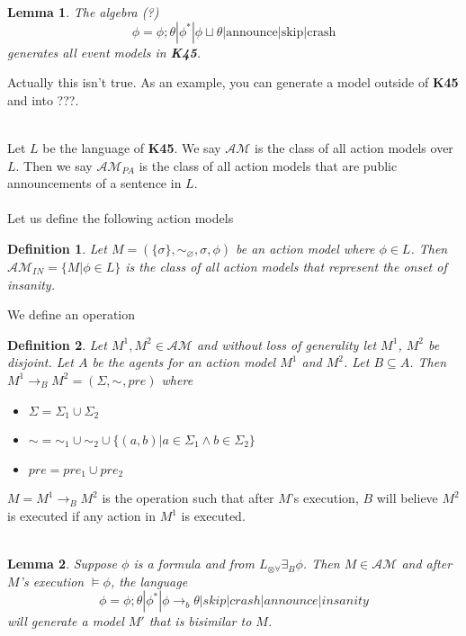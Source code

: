 \documentclass[12pt, a4paper, titlepage]{scrartcl}
\newcommand{\aRel}[1] {
  \sim_{#1} 
}
\newcommand{\actModel}[3]{
  (#1, \aRel{#2}, #3)
}
\newtheorem{defn}{Definition}
\newtheorem{lemma}{Lemma}
\begin{document}
\begin{lemma}
	The algebra (?)
	\[
		\phi = \phi ; \theta | \phi ^{\ast} | \phi \sqcup \theta | \text{announce} |
		\text{skip} | \text{crash}
	\]
	generates all event models in {\bf K45}.
\end{lemma}

\begin{note}
	Actually this isn't true.
	As an example, you can generate a model outside of {\bf K45} and into ???.\\
\end{note}
\\
Let $L$ be the language of {\bf K45}.
We say $\mathcal{AM}$ is the class of all action models over $L$.
Then we say $\mathcal{AM}_{PA}$ is the class of all action models that
are public announcements of a sentence in $L$.\\
\\
Let us define the following action models
\begin{defn} \label{insanity}
Let $M = \actModel{\{\sigma\}}{\varnothing}{{\sigma, \phi}}$ be an action model
where $\phi \in L$.
Then $\mathcal{AM}_{IN} = \{M | \phi \in L\}$ is the class of all action models
that represent the onset of insanity.
\end{defn}

We define an operation
\begin{defn} \label{believe}
Let $M^1, M^2 \in \mathcal{AM}$ and without loss of generality let $M^1$, $M^2$
be disjoint.
Let $A$ be the agents for an action model $M^1$ and $M^2$.
Let $B \subseteq A$.
Then $M^1 \rightarrow_B M^2 = \actModel{\Sigma}{}{pre}$ where
\begin{itemize}
  \item $\Sigma = \Sigma_1 \cup \Sigma_2$
  \item $\sim = \sim_1 \cup \sim_2 \cup \{(a, b) | a \in \Sigma_1 \land b \in
  \Sigma_2 \}$
  \item $pre = pre_1 \cup pre_2$
\end{itemize}
\end{defn}
$M = M^1 \rightarrow_B M^2$ is the operation such that after $M$'s execution, $B$ will
believe $M^2$ is executed if any action in $M^1$ is executed.\\
\\
\begin{lemma} \label{gen_trees}
Suppose $\phi$ is a formula and from $L_{\otimes \forall} \exists_B \phi$.
Then $M \in \mathcal{AM}$ and after $M$'s execution $\models \phi$, the language
\[
  \phi = \phi ; \theta | \phi ^ {\ast} | \phi \rightarrow_b \theta | skip |
  crash | announce | insanity
\]
will generate a model $M'$ that is bisimilar to $M$.
\end{lemma}
\end{document}
